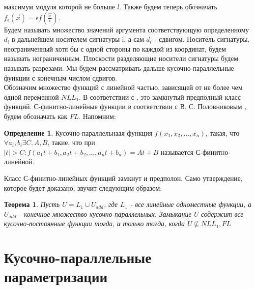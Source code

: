 \documentclass[a4paper]{article}
\theoremstyle{plain}
\newtheorem{theorem}{Теорема}
\theoremstyle{definition}
\newtheorem{definition}{Определение}
\begin{document}
максимум модуля которой не больше $l$.
Также будем теперь обозначать
$f_{\epsilon}( \vec{x}) =\epsilon f( \frac{\vec{x}}{\epsilon}).$
\\
Будем называть множество значений аргумента соответствующую определенному
$d_i$ в дальнейшем носителем сигнатуры i, а сам $d_i$ - сдвигом.
Носитель сигнатуры, неограниченный хотя бы с одной стороны по каждой из координат, будем называть нограниченным.
Плоскости разделяющие носители сигнатуры будем называть разрезами.
Мы будем рассматривать дальше кусочно-параллельные функции с конечным числом сдвигов.\\
Обозначим множество функций с линейной частью, зависящей от не более чем одной переменной $NLL_1$.
В соответствии с \cite{Otro1}, это замкнутый предполный класс функций.
С-финитно-линейные функции в соответствии с В. С. Половниковым \cite{Polov1},
будем обозначать как $FL$. Напомним:
\begin{definition}
  Кусочно-параллельнаая функция $f(x_1, x_2, \ldots, x_n)$, такая, что $\forall a_i, b_i \exists C, A, B$, такие, что при
  $|t| > C: f(a_1 t + b_1, a_2 t + b_2, \ldots, a_n t + b_n) = A t + B$ называется С-финитно-линейной.
\end{definition}
Класс С-финитно-линейных функций замкнут и предполон.
Само утверждение, которое будет доказано, звучит следующим образом:
\begin{theorem} \label{th:main}
  Пусть $U = L_1 \cup U_{add}$, где $L_1$ - все линейные одноместные функции, а $U_{add}$ - конечное множество кусочно-параллельных.
  Замыкание $U$ содержит все кусочно-постоянные функции тогда, и только тогда, когда $U \not\subseteq NLL_1, FL$
\end{theorem}

\section{Кусочно-параллельные параметризации}
\end{document}
